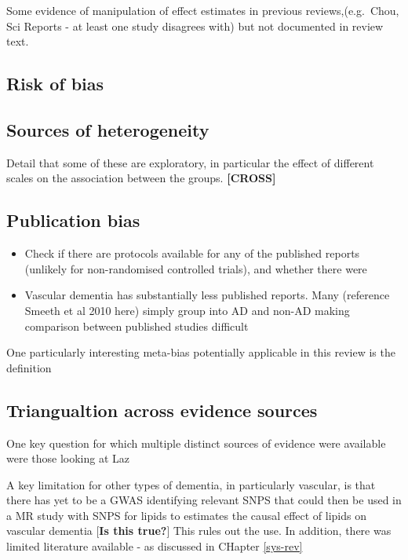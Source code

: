 \documentclass[a4paper, twoside]{templates/ociamthesis}
\providecommand{\tightlist}{%
  \setlength{\itemsep}{0pt}\setlength{\parskip}{0pt}}
\begin{document}
Some evidence of manipulation of effect estimates in previous reviews,(e.g.~Chou, Sci Reports - at least one study disagrees with) but not documented in review text.

\hypertarget{risk-of-bias-subheading}{%
\subsection{Risk of bias}\label{risk-of-bias-subheading}}

\hypertarget{sources-of-heterogeneity}{%
\subsection{Sources of heterogeneity}\label{sources-of-heterogeneity}}

Detail that some of these are exploratory, in particular the effect of different scales on the association between the groups. \textbf{{[}CROSS{]}}

\hypertarget{publication-bias}{%
\subsection{Publication bias}\label{publication-bias}}

\begin{itemize}
\tightlist
\item
  Check if there are protocols available for any of the published reports (unlikely for non-randomised controlled trials), and whether there were
\item
  Vascular dementia has substantially less published reports. Many (reference Smeeth et al 2010 here) simply group into AD and non-AD making comparison between published studies difficult
\end{itemize}

One particularly interesting meta-bias potentially applicable in this review is the definition

\hypertarget{triangualtion-across-evidence-sources}{%
\subsection{Triangualtion across evidence sources}\label{triangualtion-across-evidence-sources}}

One key question for which multiple distinct sources of evidence were available were those looking at Laz

A key limitation for other types of dementia, in particularly vascular, is that there has yet to be a GWAS identifying relevant SNPS that could then be used in a MR study with SNPS for lipids to estimates the causal effect of lipids on vascular dementia {[}\textbf{Is this true?}{]} This rules out the use. In addition, there was limited literature available - as discussed in CHapter \ref{sys-rev}
\end{document}
